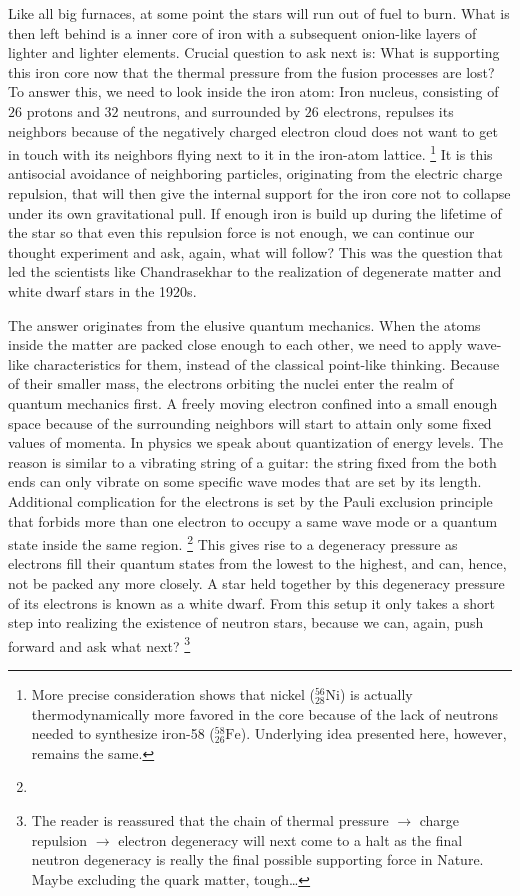 Like all big furnaces, at some point the stars will run out of fuel to burn.
What is then left behind is a inner core of iron with a subsequent onion-like layers of lighter and lighter elements.
Crucial question to ask next is: 
What is supporting this iron core now that the thermal pressure from the fusion processes are lost?
To answer this, we need to look inside the iron atom:
Iron nucleus, consisting of $26$ protons and $32$ neutrons, and surrounded by $26$ electrons, repulses its neighbors because of the negatively charged electron cloud does not want to get in touch with its neighbors flying next to it in the iron-atom lattice.
\footnote{More precise consideration shows that nickel ($^{56}_{28}\mathrm{Ni}$) is actually thermodynamically more favored in the core because of the lack of neutrons needed to synthesize iron-58 ($^{58}_{26}\mathrm{Fe}$).
Underlying idea presented here, however, remains the same.
}
It is this antisocial avoidance of neighboring particles, originating from the electric charge repulsion, that will then give the internal support for the iron core not to collapse under its own gravitational pull.
If enough iron is build up during the lifetime of the star so that even this repulsion force is not enough, we can continue our thought experiment and ask, again, what will follow?
This was the question that led the scientists like Chandrasekhar to the realization of degenerate matter and white dwarf stars in the 1920s.

The answer originates from the elusive quantum mechanics.
When the atoms inside the matter are packed close enough to each other, we need to apply wave-like characteristics for them, instead of the classical point-like thinking.
Because of their smaller mass, the electrons orbiting the nuclei enter the realm of quantum mechanics first.
A freely moving electron confined into a small enough space because of the surrounding neighbors will start to attain only some fixed values of momenta.
In physics we speak about quantization of energy levels.
The reason is similar to a vibrating string of a guitar: the string fixed from the both ends can only vibrate on some specific wave modes that are set by its length.
Additional complication for the electrons is set by the Pauli exclusion principle that forbids more than one electron to occupy a same wave mode or a quantum state inside the same region.%
\footnote{}
This gives rise to a degeneracy pressure as electrons fill their quantum states from the lowest to the highest, and can, hence, not be packed any more closely.
A star held together by this degeneracy pressure of its electrons is known as a white dwarf.
From this setup it only takes a short step into realizing the existence of neutron stars, because we can, again, push forward and ask what next?%
\footnote{The reader is reassured that the chain of thermal pressure $\rightarrow$ charge repulsion $\rightarrow$ electron degeneracy will next come to a halt as the final neutron degeneracy is really the final possible supporting force in Nature. Maybe excluding the quark matter, tough\ldots}


